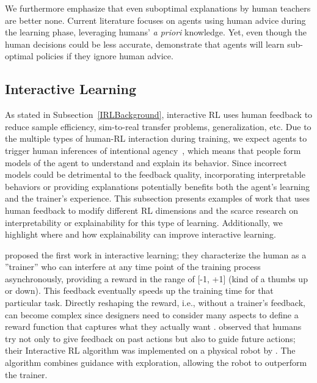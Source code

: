 \documentclass[twoside,11pt]{article}
\begin{document}
We furthermore emphasize that even suboptimal explanations by human teachers are better none. Current literature focuses on agents using human advice during the learning phase, leveraging humans' \emph{a priori} knowledge. Yet, even though the human decisions could be less accurate, \cite{Zhang:2020:human_out_loop} demonstrate that agents will learn sub-optimal policies if they ignore human advice. 

\subsection{Interactive Learning}
As stated in Subsection~\ref{IRLBackground}, interactive RL uses human feedback to reduce sample efficiency, sim-to-real transfer problems, generalization, etc. Due to the multiple types of human-RL interaction during training, we expect agents to trigger human inferences of intentional agency~\citep{de:17}, which means that people form models of the agent to understand and explain its behavior. Since incorrect models could be detrimental to the feedback quality, incorporating interpretable behaviors or providing explanations potentially benefits both the agent's learning and the trainer's experience. This subsection presents examples of work that uses human feedback to modify different RL dimensions and the scarce research on interpretability or explainability for this type of learning. Additionally, we highlight where and how explainability can improve interactive learning.

 \cite{Thomaz:2006:RLWithHumanTeachers} proposed the first work in interactive learning; they characterize the human as a ''trainer'' who can interfere at any time point of the training process asynchronously, providing a reward in the range of [-1, +1] (kind of a thumbs up or down). This feedback eventually speeds up the training time for that particular task. Directly reshaping the reward, i.e., without a trainer's feedback, can become complex since designers need to consider many aspects to define a reward function that captures what they actually want \citep{hadfield:17}. \cite{Thomaz:2006:RLWithHumanTeachers} observed that humans try not only to give feedback on past actions but also to guide future actions; their Interactive RL algorithm was implemented on a physical robot by \cite{suay:11}. The algorithm combines guidance with exploration, allowing the robot to outperform the trainer. 
\end{document}
